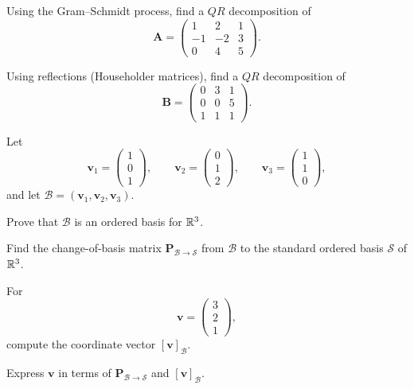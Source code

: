 \documentclass[11pt,oneside]{article}
\begin{document}
\begin{problem}
\begin{problemsubparts}
\item Using the Gram--Schmidt process, find a $QR$ decomposition of
\[
\mathbf A=
\begin{pmatrix}
1&2&1\\
-1&-2&3\\
0&4&5
\end{pmatrix}.
\]
\item Using reflections (Householder matrices), find a $QR$ decomposition of
\[
\mathbf B=
\begin{pmatrix}
0&3&1\\
0&0&5\\
1&1&1
\end{pmatrix}.
\]
\end{problemsubparts}
\end{problem}

\begin{problem}
Let
\[
\mathbf v_1=\begin{pmatrix}1\\0\\1\end{pmatrix},\qquad
\mathbf v_2=\begin{pmatrix}0\\1\\2\end{pmatrix},\qquad
\mathbf v_3=\begin{pmatrix}1\\1\\0\end{pmatrix},
\]
and let $\mathcal B=(\mathbf v_1,\mathbf v_2,\mathbf v_3)$.
\begin{problemsubparts}
\item Prove that $\mathcal B$ is an ordered basis for $\mathbb{R}^3$.
\item Find the change-of-basis matrix $\mathbf P_{\mathcal B\to\mathcal S}$ from $\mathcal B$ to the standard ordered basis $\mathcal S$ of $\mathbb{R}^3$.
\item For
\[
\mathbf v=\begin{pmatrix}3\\2\\1\end{pmatrix},
\]
compute the coordinate vector $[\mathbf v]_{\mathcal B}$.
\item Express $\mathbf v$ in terms of $\mathbf P_{\mathcal B\to\mathcal S}$ and $[\mathbf v]_{\mathcal B}$.
\end{problemsubparts}
\end{problem}
\end{document}
